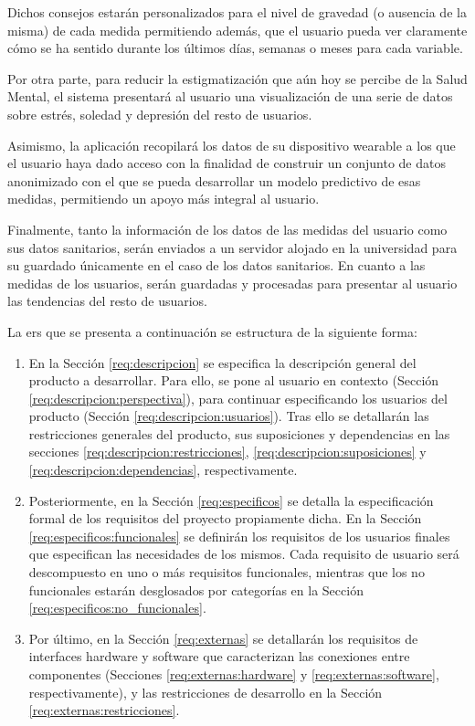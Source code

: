     Dichos consejos estarán personalizados para el nivel de gravedad (o ausencia de la misma) de cada medida permitiendo además, que el usuario pueda ver claramente cómo se ha sentido durante los últimos días, semanas o meses para cada variable.

    Por otra parte, para reducir la estigmatización que aún hoy se percibe de la Salud Mental, el sistema presentará al usuario una visualización de una serie de datos sobre estrés, soledad y depresión del resto de usuarios.

    Asimismo, la aplicación recopilará los datos de su dispositivo \gls{wearable} a los que el usuario haya dado acceso con la finalidad de construir un conjunto de datos anonimizado con el que se pueda desarrollar un modelo predictivo de esas medidas, permitiendo un apoyo más integral al usuario. 

    Finalmente, tanto la información de los datos de las medidas del usuario como sus datos sanitarios, serán enviados a un servidor alojado en la universidad para su guardado únicamente en el caso de los datos sanitarios. En cuanto a las medidas de los usuarios, serán guardadas y procesadas para presentar al usuario las tendencias del resto de usuarios.
    
    La \gls{ers} que se presenta a continuación se estructura de la siguiente forma:

    \begin{enumerate}
        \item En la Sección \ref{req:descripcion} se especifica la descripción general del producto a desarrollar. Para ello, se pone al usuario en contexto (Sección \ref{req:descripcion:perspectiva}), para continuar especificando los usuarios del producto (Sección \ref{req:descripcion:usuarios}). Tras ello se detallarán las restricciones generales del producto, sus suposiciones y dependencias en las secciones 
        \ref{req:descripcion:restricciones}, \ref{req:descripcion:suposiciones} y \ref{req:descripcion:dependencias}, respectivamente.
        \item Posteriormente, en la Sección \ref{req:especificos} se detalla la especificación formal de los requisitos del proyecto propiamente dicha. En la Sección \ref{req:especificos:funcionales} se definirán los requisitos de los usuarios finales que especifican las necesidades de los mismos. Cada requisito de usuario será descompuesto en uno o más requisitos funcionales, mientras que los no funcionales estarán desglosados por categorías en la Sección \ref{req:especificos:no_funcionales}.
        \item Por último, en la Sección \ref{req:externas} se detallarán los requisitos de interfaces hardware y software que caracterizan las conexiones entre componentes (Secciones \ref{req:externas:hardware} y \ref{req:externas:software}, respectivamente), y las restricciones de desarrollo en la Sección \ref{req:externas:restricciones}.
    \end{enumerate}
    
